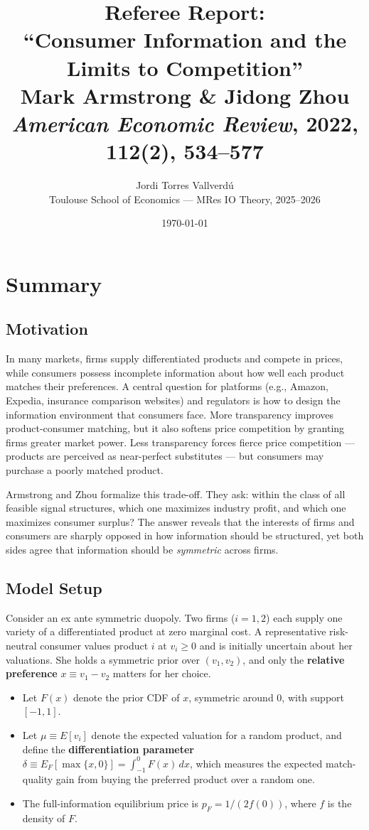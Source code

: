 \documentclass[12pt, a4paper]{article}
\title{\textbf{Referee Report: \\ ``Consumer Information and the Limits to Competition''} \\[6pt]
\large Mark Armstrong \& Jidong Zhou \\
\textit{American Economic Review}, 2022, 112(2), 534--577}
\author{Jordi Torres Vallverd\'{u} \\
\small Toulouse School of Economics --- MRes IO Theory, 2025--2026}
\date{\today}
\begin{document}
\maketitle
\thispagestyle{empty}

\section{Summary}

\subsection{Motivation}

In many markets, firms supply differentiated products and compete in prices, while consumers possess incomplete information about how well each product matches their preferences. A central question for platforms (e.g., Amazon, Expedia, insurance comparison websites) and regulators is how to design the information environment that consumers face. More transparency improves product-consumer matching, but it also softens price competition by granting firms greater market power. Less transparency forces fierce price competition --- products are perceived as near-perfect substitutes --- but consumers may purchase a poorly matched product.

Armstrong and Zhou formalize this trade-off. They ask: within the class of all feasible signal structures, which one maximizes industry profit, and which one maximizes consumer surplus? The answer reveals that the interests of firms and consumers are sharply opposed in how information should be structured, yet both sides agree that information should be \emph{symmetric} across firms.

\subsection{Model Setup}

Consider an ex ante symmetric duopoly. Two firms ($i = 1,2$) each supply one variety of a differentiated product at zero marginal cost. A representative risk-neutral consumer values product $i$ at $v_i \geq 0$ and is initially uncertain about her valuations. She holds a symmetric prior over $(v_1, v_2)$, and only the \textbf{relative preference} $x \equiv v_1 - v_2$ matters for her choice.

\begin{itemize}[nosep]
    \item Let $F(x)$ denote the prior CDF of $x$, symmetric around $0$, with support $[-1,1]$.
    \item Let $\mu \equiv E[v_i]$ denote the expected valuation for a random product, and define the \textbf{differentiation parameter} $\delta \equiv E_F[\max\{x,0\}] = \int_{-1}^{0} F(x)\,dx$, which measures the expected match-quality gain from buying the preferred product over a random one.
    \item The full-information equilibrium price is $p_F = 1/(2f(0))$, where $f$ is the density of $F$.
\end{itemize}
\end{document}
